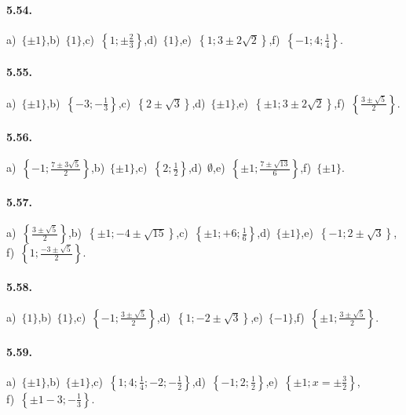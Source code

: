 \paragraph{5.54.} a)~$\{\pm 1\}$,\quad b)~$\{1\}$,\quad c)~$\left\{1;\pm\frac 2 3\right\}$,\quad d)~$\{1\}$,\quad e)~$\left\{1;3\pm 2\sqrt 2\right\}$,\quad f)~$\left\{-1;4;\frac 1 4\right\}$.

\paragraph{5.55.} a)~$\{\pm 1\}$,\quad b)~$\left\{-3;-\frac 1 3\right\}$,\quad c)~$\left\{2\pm\sqrt 3\right\}$,\quad d)~$\{\pm 1\}$,\quad e)~$\left\{\pm 1;3\pm 2\sqrt 2\right\}$,\quad f)~$\left\{\frac{3\pm\sqrt 5} 2\right\}$.

\paragraph{5.56.} a)~$\left\{-1;\frac{7\pm 3\sqrt 5} 2\right\}$,\quad b)~$\{\pm 1\}$,\quad c)~$\left\{2;\frac 1 2\right\}$,\quad d)~$\emptyset$,\quad e)~$\left\{\pm 1;\frac{7\pm \sqrt{13}} 6\right\}$,\quad f)~$\{\pm 1\}$.

\paragraph{5.57.} a)~$\left\{\frac{3\pm\sqrt 5} 2\right\}$,\quad b)~$\left\{\pm 1;-4\pm \sqrt{15}\right\}$,\quad c)~$\left\{\pm 1;+6;\frac 1 6\right\}$,\quad d)~$\{\pm 1\}$,\quad e)~$\left\{-1;2\pm\sqrt 3\right\}$,\protect\\ \quad f)~$\left\{1;\frac{-3\pm\sqrt 5} 2\right\}$.

\paragraph{5.58.} a)~$\{1\}$,\quad b)~$\{1\}$,\quad c)~$\left\{-1;\frac{3\pm\sqrt 5} 2\right\}$,\quad d)~$\left\{1;-2\pm\sqrt 3\right\}$,\quad e)~$\{-1\}$,\quad f)~$\left\{\pm 1;\frac{3\pm \sqrt 5} 2\right\}$.

\paragraph{5.59.} a)~$\{\pm 1\}$,\quad b)~$\{\pm 1\}$,\quad c)~$\left\{1;4;\frac 1 4;-2;-\frac 1 2\right\}$,\quad d)~$\left\{-1;2;\frac 1 2\right\}$,\quad e)~$\left\{\pm 1;x=\pm\frac 3 2\right\}$,\protect\\ \quad f)~$\left\{\pm 1-3;-\frac 1 3\right\}$.

